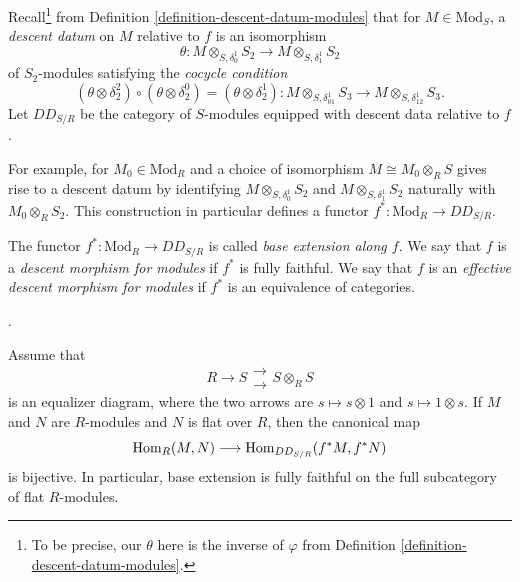 \medskip\noindent
Recall\footnote{To be precise, our $\theta$ here is the inverse of
$\varphi$ from Definition \ref{definition-descent-datum-modules}.}
from Definition \ref{definition-descent-datum-modules} that for
$M \in \text{Mod}_S$, a {\it descent datum} on $M$ relative to $f$ is
an isomorphism
$$
\theta :
M \otimes_{S,\delta^1_0} S_2
\longrightarrow
M \otimes_{S,\delta^1_1} S_2
$$
of $S_2$-modules satisfying the {\it cocycle condition}
\begin{equation}
\label{equation-cocycle-condition}
(\theta \otimes \delta_2^2) \circ (\theta \otimes \delta_2^0) = (\theta \otimes 
\delta_2^1):
M \otimes_{S, \delta^1_{01}} S_3 \to M \otimes_{S,\delta^1_{12}} S_3.
\end{equation}
Let $DD_{S/R}$ be the category of $S$-modules equipped with descent data 
relative to $f$.

\medskip\noindent
For example, for $M_0 \in \text{Mod}_R$ and a choice of isomorphism
$M \cong M_0 \otimes_R S$ gives rise to a descent datum by identifying
$M \otimes_{S,\delta^1_0} S_2$ and $M \otimes_{S,\delta^1_1} S_2$
naturally with $M_0 \otimes_R S_2$. This construction in particular
defines a functor $f^*: \text{Mod}_R \to DD_{S/R}$.

\begin{definition}
\label{definition-effective-descent}
The functor $f^*: \text{Mod}_R \to DD_{S/R}$
is called {\it base extension along $f$}. We say that $f$ is a
{\it descent morphism for modules} if $f^*$ is fully
faithful. We say that $f$ is an {\it effective descent morphism for modules}
if $f^*$ is an equivalence of categories.
\end{definition}

\begin{lemma}
\label{lemma-equalizer-flat-module-descent}
\begin{reference}
\cite[Expos\'e 190, n\textsuperscript{o} 2(c), pp. 306--307]{FGA}.
\end{reference}
Assume that
$$
R \longrightarrow S
\mathrel{\substack{\longrightarrow \\[-0.6ex] \longrightarrow}}
S \otimes_R S
$$
is an equalizer diagram, where the two arrows are
$s \mapsto s \otimes 1$ and $s \mapsto 1 \otimes s$. If $M$ and $N$ are
$R$-modules and $N$ is flat over $R$, then the canonical map
$$
\mathop{\mathrm{Hom}}\nolimits_R(M, N) \longrightarrow \mathop{\mathrm{Hom}}\nolimits_{DD_{S/R}}(f^*M, f^*N)
$$
is bijective. In particular, base extension is fully faithful on the full
subcategory of flat $R$-modules.
\end{lemma}

